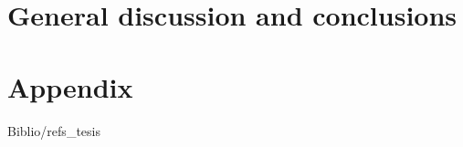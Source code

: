 \part{General discussion and conclusions}\label{part3}

%

\appendix
\part{Appendix}






 {Biblio/refs_tesis}




